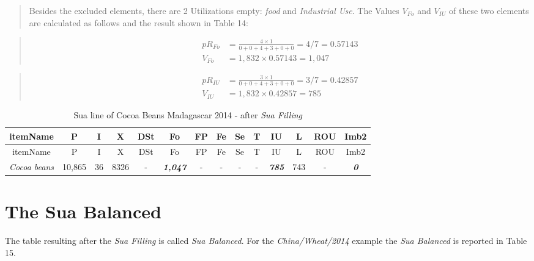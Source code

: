 \documentclass[]{article}
\begin{document}
\begin{quote}
Besides the excluded elements, there are 2 Utilizations empty:
\emph{food} and \emph{Industrial Use}. The Values \(V_{Fo}\) and
\(V_{IU}\) of these two elements are calculated as follows and the
result shown in Table 14:
\end{quote}

\begin{quote}
\begin{equation}
\begin{aligned}
pR_{Fo} &= \frac{4\times 1}{0 + 0 + 4 + 3 + 0 + 0} = 4/7 = 0.57143 \\
V_{Fo} &= 1,832 \times 0.57143 = 1,047 
\end{aligned}
\end{equation}
\end{quote}

\begin{quote}
\end{quote}

\begin{quote}
\begin{equation}
\begin{aligned}
\label{eq:VIUC}
pR_{IU} &= \frac{3\times 1}{0 + 0 + 4 + 3 + 0 + 0} = 3/7 = 0.42857\\
V_{IU} &= 1,832 \times 0.42857 = 785
\end{aligned}
\end{equation}
\end{quote}

\begin{longtable}[]{@{}cccccccccccccc@{}}
\caption{Sua line of Cocoa Beans Madagascar 2014 - after \emph{Sua
Filling}}\tabularnewline
\toprule
itemName & P & I & X & DSt & Fo & FP & Fe & Se & T & IU & L & ROU &
Imb2\tabularnewline
\midrule
\endfirsthead
\toprule
itemName & P & I & X & DSt & Fo & FP & Fe & Se & T & IU & L & ROU &
Imb2\tabularnewline
\midrule
\endhead
\emph{Cocoa beans} & 10,865 & 36 & 8326 & - & \textbf{\emph{1,047}} & -
& - & - & - & \textbf{\emph{785}} & 743 & - &
\textbf{\emph{0}}\tabularnewline
\bottomrule
\end{longtable}

\section{The Sua Balanced}\label{the-sua-balanced}

The table resulting after the \emph{Sua Filling} is called \emph{Sua
Balanced}. For the \emph{China/Wheat/2014} example the \emph{Sua
Balanced} is reported in Table 15.
\end{document}
